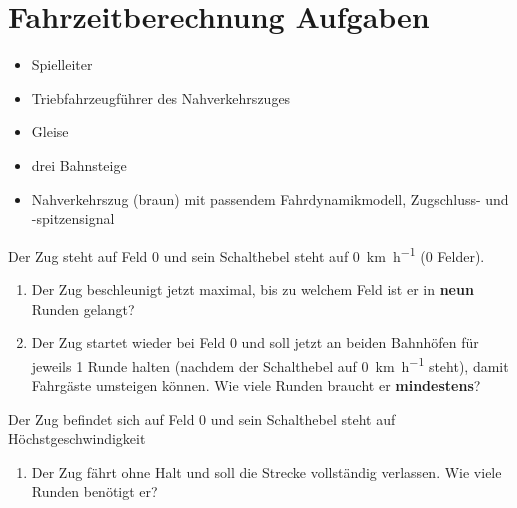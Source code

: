 

\section{Fahrzeitberechnung Aufgaben}

  \roles
    \begin{itemize}
      \item Spielleiter
      \item Triebfahrzeugführer des Nahverkehrszuges
    \end{itemize}

  \material
    \begin{itemize}
      \item Gleise
      \item drei Bahnsteige
      \item Nahverkehrszug (braun) mit passendem Fahrdynamikmodell, Zugschluss- und -spitzensignal
    \end{itemize}

  \setup

  \task
    Der Zug steht auf Feld 0 und sein Schalthebel steht auf \SI{0}{\kilo\metre\per\hour} (0 Felder).
    \begin{enumerate}[label=\alph*)]
      \item Der Zug beschleunigt jetzt maximal, bis zu welchem Feld ist er in \textbf{neun} Runden gelangt?
      \item Der Zug startet wieder bei Feld 0 und soll jetzt an beiden Bahnhöfen für jeweils 1 Runde halten (nachdem der Schalthebel auf \SI{0}{\kilo\metre\per\hour} steht), damit Fahrgäste umsteigen können. Wie viele Runden braucht er \textbf{mindestens}? 
    \end{enumerate}

  \setup
    Der Zug befindet sich auf Feld 0 und sein Schalthebel steht auf Höchstgeschwindigkeit
    \begin{enumerate}[label=\alph*),resume]
      \item Der Zug fährt ohne Halt und soll die Strecke vollständig verlassen. Wie viele Runden benötigt er?
    \end{enumerate}
